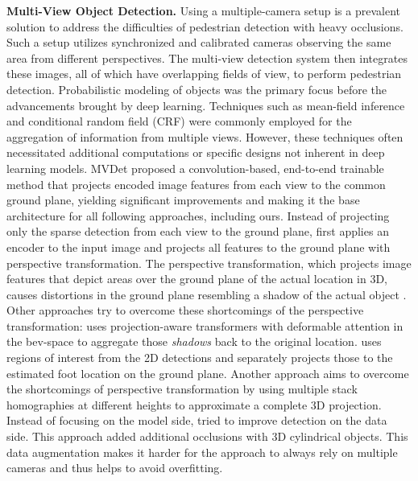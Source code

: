 \documentclass[10pt,twocolumn,letterpaper]{article}
\newcommand{\nparagraph}[1]{\noindent\textbf{#1.  }}
\begin{document}
\nparagraph{Multi-View Object Detection}
Using a multiple-camera setup is a prevalent solution to address the difficulties of pedestrian detection with heavy occlusions. Such a setup utilizes synchronized and calibrated cameras observing the same area from different perspectives. The multi-view detection system then integrates these images, all of which have overlapping fields of view, to perform pedestrian detection. Probabilistic modeling of objects \cite{coates2010multi, sankaranarayanan2008object} was the primary focus before the advancements brought by deep learning. Techniques such as mean-field inference \cite{baque2017deep, fleuret2007multicamera} and conditional random field (CRF) \cite{baque2017deep, roig2011conditional} were commonly employed for the aggregation of information from multiple views. However, these techniques often necessitated additional computations or specific designs not inherent in deep learning models. MVDet \cite{hou2020multiview} proposed a convolution-based, end-to-end trainable method that projects encoded image features from each view to the common ground plane, yielding significant improvements and making it the base architecture for all following approaches, including ours. Instead of projecting only the sparse detection from each view to the ground plane, \cite{hou2020multiview} first applies an encoder to the input image and projects all features to the ground plane with perspective transformation. The perspective transformation, which projects image features that depict areas over the ground plane of the actual location in 3D, causes distortions in the ground plane resembling a shadow of the actual object \cite{hou2021multiview}. Other approaches \cite{hou2021multiview, lee2023multi, song2021stacked} try to overcome these shortcomings of the perspective transformation: \cite{hou2021multiview} uses projection-aware transformers with deformable attention in the \gls{bev}-space to aggregate those \textit{shadows} back to the original location. \cite{lee2023multi} uses regions of interest from the 2D detections and separately projects those to the estimated foot location on the ground plane. Another approach \cite{song2021stacked} aims to overcome the shortcomings of perspective transformation by using multiple stack homographies at different heights to approximate a complete 3D projection.
Instead of focusing on the model side, \cite{qiu20223d} tried to improve detection on the data side. This approach added additional occlusions with 3D cylindrical objects. This data augmentation makes it harder for the approach to always rely on multiple cameras and thus helps to avoid overfitting.
\end{document}
